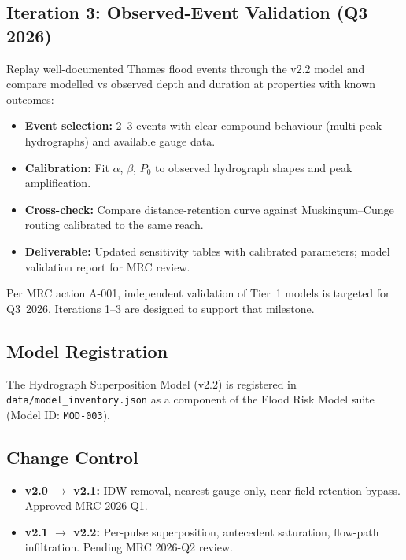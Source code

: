 \documentclass[11pt,a4paper]{article}
\begin{document}
\subsection{Iteration 3: Observed-Event Validation (Q3 2026)}

Replay well-documented Thames flood events through the v2.2 model and compare
modelled vs observed depth and duration at properties with known outcomes:

\begin{itemize}[nosep]
    \item \textbf{Event selection:} 2--3 events with clear compound behaviour
          (multi-peak hydrographs) and available gauge data.
    \item \textbf{Calibration:} Fit $\alpha$, $\beta$, $P_0$ to observed
          hydrograph shapes and peak amplification.
    \item \textbf{Cross-check:} Compare distance-retention curve against
          Muskingum--Cunge routing calibrated to the same reach.
    \item \textbf{Deliverable:} Updated sensitivity tables with calibrated
          parameters; model validation report for MRC review.
\end{itemize}

\noindent Per MRC action A-001, independent validation of Tier~1 models is
targeted for Q3~2026.  Iterations 1--3 are designed to support that milestone.

\mkmgovernance

\subsection{Model Registration}
The Hydrograph Superposition Model (v2.2) is registered in
\texttt{data/model\_inventory.json} as a component of the Flood Risk Model suite
(Model ID: \texttt{MOD-003}).

\subsection{Change Control}
\begin{itemize}[nosep]
    \item \textbf{v2.0 $\to$ v2.1:} IDW removal, nearest-gauge-only, near-field
          retention bypass.  Approved MRC 2026-Q1.
    \item \textbf{v2.1 $\to$ v2.2:} Per-pulse superposition, antecedent saturation,
          flow-path infiltration.  Pending MRC 2026-Q2 review.
\end{itemize}
\end{document}
